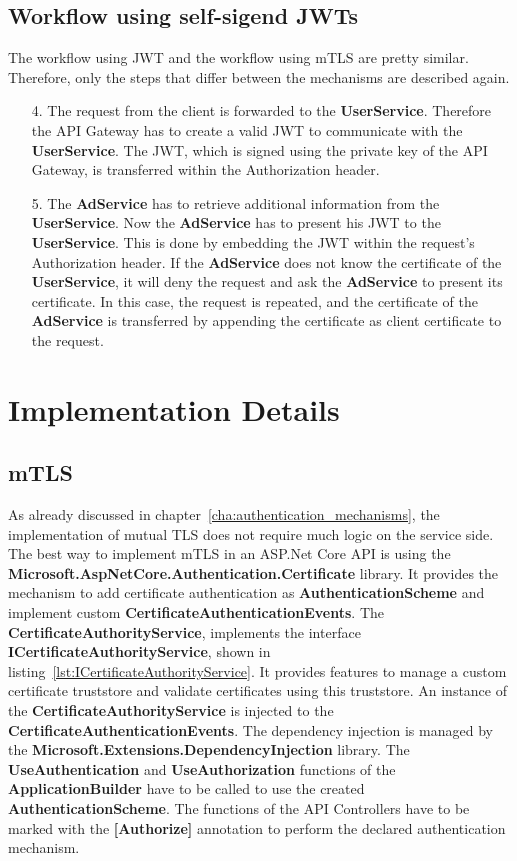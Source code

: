 \subsection{Workflow using self-sigend JWTs}
The workflow using JWT and the workflow using mTLS are pretty similar.
Therefore, only the steps that differ between the mechanisms are described again.
\begin{enumerate}
	\item[4.] The request from the client is forwarded to the \textbf{UserService}. 
		Therefore the API Gateway has to create a valid JWT to communicate with the \textbf{UserService}.
		The JWT, which is signed using the private key of the API Gateway, is transferred within the Authorization header.
	\item[5.] The \textbf{AdService} has to retrieve additional information from the \textbf{UserService}.
		Now the \textbf{AdService} has to present his JWT to the \textbf{UserService}.
		This is done by embedding the JWT within the request's Authorization header.
		If the \textbf{AdService} does not know the certificate of the \textbf{UserService}, it will deny the request and ask the \textbf{AdService} to present its certificate.
		In this case, the request is repeated, and the certificate of the \textbf{AdService} is transferred by appending the certificate as client certificate to the request.
\end{enumerate}

\section{Implementation Details}

\subsection{mTLS} \label{sec:impl_details_mtls}
As already discussed in chapter~\ref{cha:authentication_mechanisms}, the implementation of mutual TLS does not require much logic on the service side.
The best way to implement mTLS in an ASP.Net Core API is using the \textbf{Microsoft.AspNetCore.Authentication.Certificate} library.
It provides the mechanism to add certificate authentication as \textbf{AuthenticationScheme} and implement custom \textbf{CertificateAuthenticationEvents}.
The \textbf{CertificateAuthorityService}, implements the interface \textbf{ICertificateAuthorityService}, shown in listing~\ref{lst:ICertificateAuthorityService}.
It provides features to manage a custom certificate truststore and validate certificates using this truststore.
An instance of the \textbf{CertificateAuthorityService} is injected to the \textbf{CertificateAuthenticationEvents}.
The dependency injection is managed by the \textbf{Microsoft.Extensions.DependencyInjection} library.
The \textbf{UseAuthentication} and \textbf{UseAuthorization} functions of the \textbf{ApplicationBuilder} have to be called to use the created \textbf{AuthenticationScheme}.
The functions of the API Controllers have to be marked with the \textbf{[Authorize]} annotation to perform the declared authentication mechanism.

